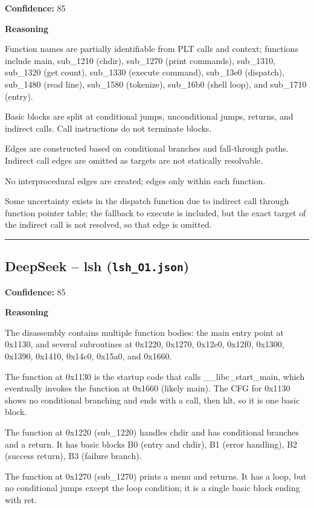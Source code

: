 \textbf{Confidence:} 85

\textbf{Reasoning}

Function names are partially identifiable from PLT calls and context; functions include main, sub\_1210 (chdir), sub\_1270 (print commands), sub\_1310, sub\_1320 (get count), sub\_1330 (execute command), sub\_13e0 (dispatch), sub\_1480 (read line), sub\_1580 (tokenize), sub\_16b0 (shell loop), and sub\_1710 (entry).

Basic blocks are split at conditional jumps, unconditional jumps, returns, and indirect calls. Call instructions do not terminate blocks.

Edges are constructed based on conditional branches and fall-through paths. Indirect call edges are omitted as targets are not statically resolvable.

No interprocedural edges are created; edges only within each function.

Some uncertainty exists in the dispatch function due to indirect call through function pointer table; the fallback to execute is included, but the exact target of the indirect call is not resolved, so that edge is omitted.

\bigskip
\hrule
\bigskip

\subsection{DeepSeek -- lsh (\texttt{lsh\_O1.json})}

\textbf{Confidence:} 85

\textbf{Reasoning}

The disassembly contains multiple function bodies: the main entry point at 0x1130, and several subroutines at 0x1220, 0x1270, 0x12e0, 0x12f0, 0x1300, 0x1390, 0x1410, 0x14c0, 0x15a0, and 0x1660.

The function at 0x1130 is the startup code that calls \_\_libc\_start\_main, which eventually invokes the function at 0x1660 (likely main). The CFG for 0x1130 shows no conditional branching and ends with a call, then hlt, so it is one basic block.

The function at 0x1220 (sub\_1220) handles chdir and has conditional branches and a return. It has basic blocks B0 (entry and chdir), B1 (error handling), B2 (success return), B3 (failure branch).

The function at 0x1270 (sub\_1270) prints a menu and returns. It has a loop, but no conditional jumps except the loop condition; it is a single basic block ending with ret.

